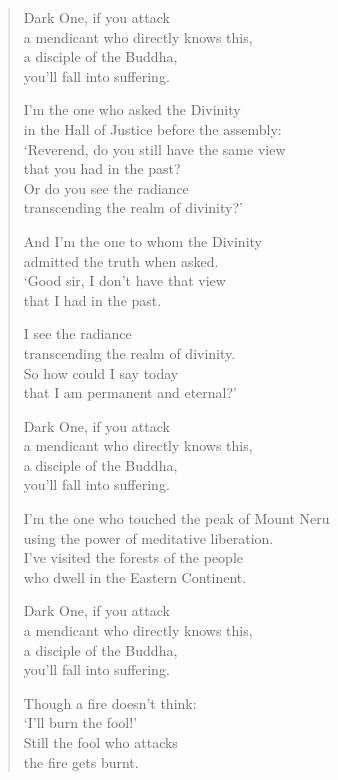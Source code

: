\documentclass[12pt,openany]{book}%
\begin{document}
\begin{verse}
Dark One, if you attack \\
a mendicant who directly knows this, \\
a disciple of the Buddha, \\
you’ll fall into suffering. 

I’m the one who asked the Divinity \\
in the Hall of Justice before the assembly: \\
‘Reverend, do you still have the same view \\
that you had in the past? \\
Or do you see the radiance \\
transcending the realm of divinity?’ 

And I’m the one to whom the Divinity \\
admitted the truth when asked. \\
‘Good sir, I don’t have that view \\
that I had in the past. 

I see the radiance \\
transcending the realm of divinity. \\
So how could I say today \\
that I am permanent and eternal?’ 

Dark One, if you attack \\
a mendicant who directly knows this, \\
a disciple of the Buddha, \\
you’ll fall into suffering. 

I’m the one who touched the peak of Mount Neru \\
using the power of meditative liberation. \\
I’ve visited the forests of the people \\
who dwell in the Eastern Continent. 

Dark One, if you attack \\
a mendicant who directly knows this, \\
a disciple of the Buddha, \\
you’ll fall into suffering. 

Though a fire doesn’t think: \\
‘I’ll burn the fool!’ \\
Still the fool who attacks \\
the fire gets burnt. 


\end{verse}
\end{document}

